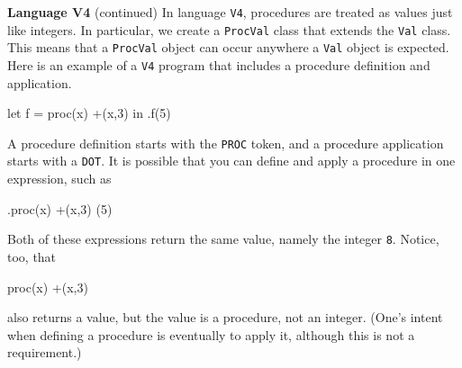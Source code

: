 \begin{minipage}[t]{\sw}
\slidenumber
\LARGE
{\bf Language V4} (continued)\exx
In language \verb'V4', procedures are treated as values
just like integers.
In particular, we create a \verb'ProcVal' class
that extends the \verb'Val' class.
This means that a \verb'ProcVal' object can occur
anywhere a \verb'Val' object is expected.\exx
Here is an example of a \verb'V4' program
that includes a procedure definition and application.
\Large
\begin{qv}
let
  f = proc(x) +(x,3)
in
  .f(5)
\end{qv}
\LARGE
A procedure definition starts with the \verb'PROC' token,
and a procedure application starts with a \verb'DOT'.
It is possible that you can define and apply a procedure in one expression,
such as
\Large
\begin{qv}
.proc(x) +(x,3) (5)
\end{qv}
\LARGE
Both of these expressions return the same value,
namely the integer \verb'8'.
Notice, too, that
\Large
\begin{qv}
proc(x) +(x,3)
\end{qv}
\LARGE
also returns a value, but the value is a procedure, not an integer.
(One's intent when defining a procedure is eventually to apply it,
although this is not a requirement.)
\end{minipage}

